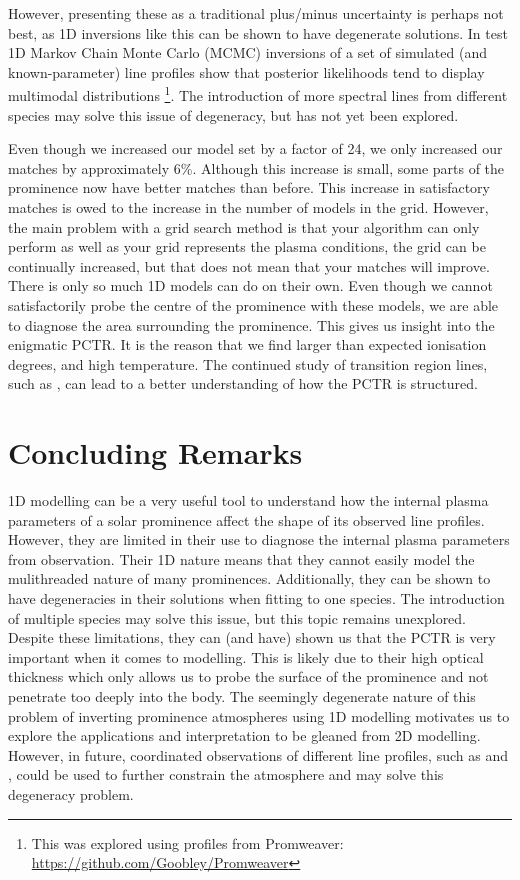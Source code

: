 However, presenting these as a traditional plus/minus uncertainty is perhaps not best, as 1D inversions like this can be shown to have degenerate solutions. In test 1D Markov Chain Monte Carlo (MCMC) inversions of a set of simulated (and known-parameter) \mgiihk{} line profiles show that posterior likelihoods tend to display multimodal distributions \citep{osborne_notitle_2022}\footnote{This was explored using profiles from Promweaver: \href{https://github.com/Goobley/Promweaver}{https://github.com/Goobley/Promweaver}}. The introduction of more spectral lines from different species may solve this issue of degeneracy, but has not yet been explored. 

Even though we increased our model set by a factor of 24, we only increased our matches by approximately 6\%. Although this increase is small, some parts of the prominence now have better matches than before. This increase in satisfactory matches is owed to the increase in the number of models in the grid. However, the main problem with a grid search method is that your algorithm can only perform as well as your grid represents the plasma conditions, the grid can be continually increased, but that does not mean that your matches will improve. There is only so much 1D models can do on their own. Even though we cannot satisfactorily probe the centre of the prominence with these models, we are able to diagnose the area surrounding the prominence. This gives us insight into the enigmatic PCTR. It is the reason that we find larger than expected ionisation degrees, and high temperature. The continued study of transition region lines, such as \mgiihk{}, can lead to a better understanding of how the PCTR is structured.  



\section{Concluding Remarks}

1D modelling can be a very useful tool to understand how the internal plasma parameters of a solar prominence affect the shape of its observed line profiles.
However, they are limited in their use to diagnose the internal plasma parameters from observation. Their 1D nature means that they cannot easily model the mulithreaded nature of many prominences. Additionally, they can be shown to have degeneracies in their solutions when fitting to one species. The introduction of multiple species may solve this issue, but this topic remains unexplored. Despite these limitations, they can (and have) shown us that the PCTR is very important when it comes to \mgiihk{} modelling. This is likely due to their high optical thickness which only allows us to probe the surface of the prominence and not penetrate too deeply into the body. The seemingly degenerate nature of this problem of inverting prominence atmospheres using 1D modelling motivates us to explore the applications and interpretation to be gleaned from 2D modelling. However, in future, coordinated observations of different line profiles, such as \mgiihk{} and \ha{}, could be used to further constrain the atmosphere and may solve this degeneracy problem.